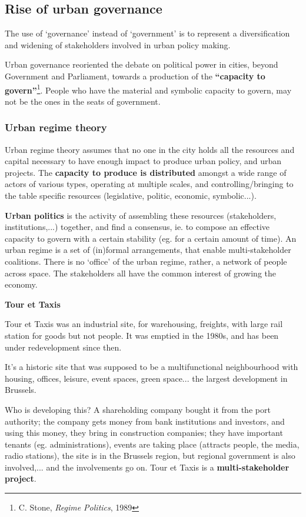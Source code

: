 \documentclass{article}
\begin{document}
\subsection{Rise of urban governance}

The use of `governance' instead of `government' is to represent a diversification and widening of stakeholders involved in urban policy making.

Urban governance reoriented the debate on political power in cities, beyond Government and Parliament, towards a production of the \textbf{``capacity to govern''}\footnote{C. Stone, \textit{Regime Politics}, 1989}. People who have the material and symbolic capacity to govern, may not be the ones in the seats of government.

\subsubsection{Urban regime theory}

Urban regime theory assumes that no one in the city holds all the resources and capital necessary to have enough impact to produce urban policy, and urban projects. The \textbf{capacity to produce is distributed} amongst a wide range of actors of various types, operating at multiple scales, and controlling/bringing to the table specific resources (legislative, politic, economic, symbolic...).

\textbf{Urban politics} is the activity of assembling these resources (stakeholders, institutions,...) together, and find a consensus, ie. to compose an effective capacity to govern with a certain stability (eg. for a certain amount of time). An urban regime is a set of (in)formal  arrangements, that enable multi-stakeholder coalitions. There is no `office' of the urban regime, rather, a network of people across space.
The stakeholders all have the common interest of growing the economy.

\textbf{Tour et Taxis}

Tour et Taxis was an industrial site, for warehousing, freights, with large rail station for goods but not people. It was emptied in the 1980s, and has been under redevelopment since then.

It's a historic site that was supposed to be a multifunctional neighbourhood with housing, offices, leisure, event spaces, green space... the largest development in Brussels.

Who is developing this? A shareholding company bought it from the port authority; the company gets money from bank institutions and investors, and using this money, they bring in construction companies; they have important tenants (eg. administrations), events are taking place (attracts people, the media, radio stations), the site is in the Brussels region, but regional government is also involved,... and the involvements go on. Tour et Taxis is a \textbf{multi-stakeholder project}.
\end{document}
